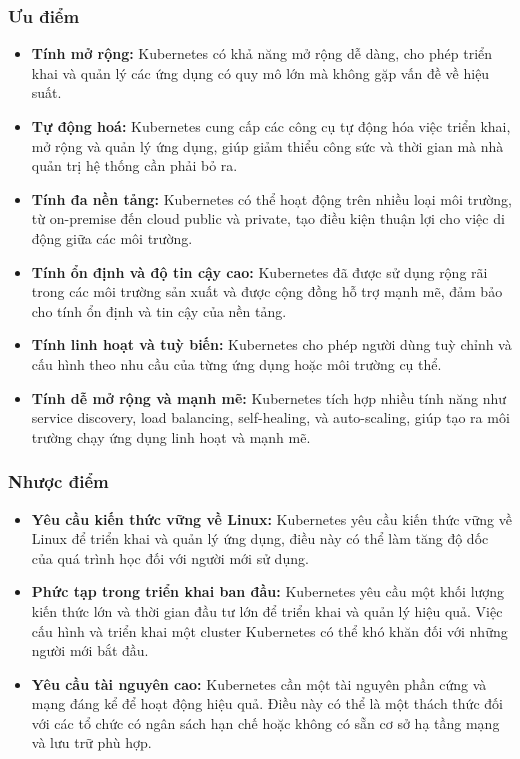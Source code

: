 \subsubsection{Ưu điểm}
\begin{itemize}
  \item \textbf{Tính mở rộng:} Kubernetes có khả năng mở rộng dễ dàng, cho phép triển khai và quản lý các ứng dụng có quy mô lớn mà không gặp vấn đề về hiệu suất.
  \item \textbf{Tự động hoá:} Kubernetes cung cấp các công cụ tự động hóa việc triển khai, mở rộng và quản lý ứng dụng, giúp giảm thiểu công sức và thời gian mà nhà quản trị hệ thống cần phải bỏ ra.
  \item \textbf{Tính đa nền tảng:} Kubernetes có thể hoạt động trên nhiều loại môi trường, từ on-premise đến cloud public và private, tạo điều kiện thuận lợi cho việc di động giữa các môi trường.
  \item \textbf{Tính ổn định và độ tin cậy cao:} Kubernetes đã được sử dụng rộng rãi trong các môi trường sản xuất và được cộng đồng hỗ trợ mạnh mẽ, đảm bảo cho tính ổn định và tin cậy của nền tảng.
  \item \textbf{Tính linh hoạt và tuỳ biến:} Kubernetes cho phép người dùng tuỳ chỉnh và cấu hình theo nhu cầu của từng ứng dụng hoặc môi trường cụ thể.
  \item \textbf{Tính dễ mở rộng và mạnh mẽ:} Kubernetes tích hợp nhiều tính năng như service discovery, load balancing, self-healing, và auto-scaling, giúp tạo ra môi trường chạy ứng dụng linh hoạt và mạnh mẽ.
\end{itemize}
\subsubsection{Nhược điểm}
\begin{itemize}
  \item \textbf{Yêu cầu kiến thức vững về Linux:} Kubernetes yêu cầu kiến thức vững về Linux để triển khai và quản lý ứng dụng, điều này có thể làm tăng độ dốc của quá trình học đối với người mới sử dụng.
  \item \textbf{Phức tạp trong triển khai ban đầu:} Kubernetes yêu cầu một khối lượng kiến thức lớn và thời gian đầu tư lớn để triển khai và quản lý hiệu quả. Việc cấu hình và triển khai một cluster Kubernetes có thể khó khăn đối với những người mới bắt đầu.
  \item \textbf{Yêu cầu tài nguyên cao:} Kubernetes cần một tài nguyên phần cứng và mạng đáng kể để hoạt động hiệu quả. Điều này có thể là một thách thức đối với các tổ chức có ngân sách hạn chế hoặc không có sẵn cơ sở hạ tầng mạng và lưu trữ phù hợp.
\end{itemize}
